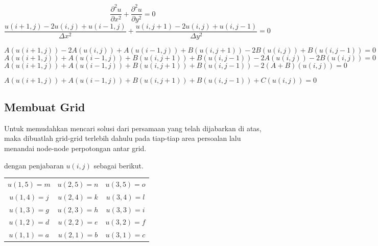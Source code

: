 \documentclass{article}
\begin{document}
\[ \frac{\partial^2 u}{\partial x^2}+{\frac{\partial^2 u}{\partial y^2}}=0\]
\[\frac {u(i+1,j)-2u(i,j)+u(i-1,j)}{\Delta x^2}+\frac {u(i,j+1)-2u(i,j)+u(i,j-1)}{\Delta y^2}=0\]


\[{A(u(i+1,j))-2A (u(i,j))+A (u(i-1,j))}+ {B(u(i,j+1))-2B(u(i,j))+B(u(i,j-1))}=0\]
\[A(u(i+1,j))+A (u(i-1,j))+ B(u(i,j+1))+B(u(i,j-1))-2A (u(i,j))-2B (u(i,j))=0\]
\[A(u(i+1,j))+A (u(i-1,j))+ B(u(i,j+1))+B(u(i,j-1))-2(A+B)(u(i,j))=0\]

\begin{equation}
\label{eq:1}
A(u(i+1,j))+A (u(i-1,j))+ B(u(i,j+1))+B(u(i,j-1))+C(u(i,j))=0
\end{equation}

\subsection{Membuat Grid}
Untuk memudahkan mencari solusi dari persamaan yang telah dijabarkan di atas, maka dibuatlah grid-grid terlebih dahulu pada tiap-tiap area persoalan lalu menandai node-node perpotongan antar grid.

\begin{center}

\end{center}

dengan penjabaran \(u(i,j)\) sebagai berikut.
\begin{center}
\begin{tabular}{c c c}
    \(u(1,5)=m\) & \(u(2,5)=n\) & \(u(3,5)=o\) \\
    \(u(1,4)=j\) & \(u(2,4)=k\) & \(u(3,4)=l\) \\
    \(u(1,3)=g\) & \(u(2,3)=h\) & \(u(3,3)=i\) \\
    \(u(1,2)=d\) & \(u(2,2)=e\) & \(u(3,2)=f\) \\
    \(u(1,1)=a\) & \(u(2,1)=b\) & \(u(3,1)=c\) \\
\end{tabular}
\end{center}
\end{document}
